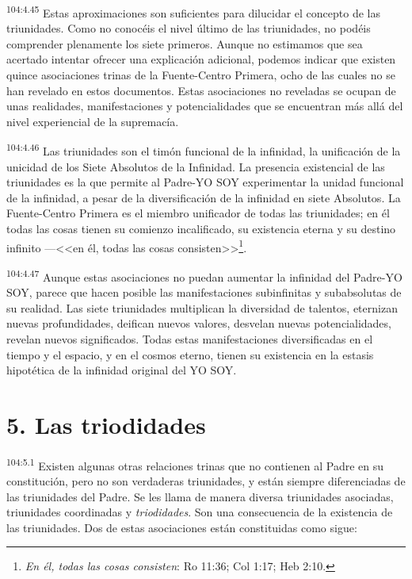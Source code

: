 \documentclass[twoside, 11pt]{book}
\begin{document}
\par
\textsuperscript{104:4.45} Estas aproximaciones son suficientes para dilucidar el concepto de las triunidades. Como no conocéis el nivel último de las triunidades, no podéis comprender plenamente los siete primeros. Aunque no estimamos que sea acertado intentar ofrecer una explicación adicional, podemos indicar que existen quince asociaciones trinas de la Fuente-Centro Primera, ocho de las cuales no se han revelado en estos documentos. Estas asociaciones no reveladas se ocupan de unas realidades, manifestaciones y potencialidades que se encuentran más allá del nivel experiencial de la supremacía.

\par
\textsuperscript{104:4.46} Las triunidades son el timón funcional de la infinidad, la unificación de la unicidad de los Siete Absolutos de la Infinidad. La presencia existencial de las triunidades es la que permite al Padre-YO SOY experimentar la unidad funcional de la infinidad, a pesar de la diversificación de la infinidad en siete Absolutos. La Fuente-Centro Primera es el miembro unificador de todas las triunidades; en él todas las cosas tienen su comienzo incalificado, su existencia eterna y su destino infinito ---<<en él, todas las cosas consisten>>\footnote{\textit{En él, todas las cosas consisten}: Ro 11:36; Col 1:17; Heb 2:10.}.

\par
\textsuperscript{104:4.47} Aunque estas asociaciones no puedan aumentar la infinidad del Padre-YO SOY, parece que hacen posible las manifestaciones subinfinitas y subabsolutas de su realidad. Las siete triunidades multiplican la diversidad de talentos, eternizan nuevas profundidades, deifican nuevos valores, desvelan nuevas potencialidades, revelan nuevos significados. Todas estas manifestaciones diversificadas en el tiempo y el espacio, y en el cosmos eterno, tienen su existencia en la estasis hipotética de la infinidad original del YO SOY.

\section*{5. Las triodidades}
\par
\textsuperscript{104:5.1} Existen algunas otras relaciones trinas que no contienen al Padre en su constitución, pero no son verdaderas triunidades, y están siempre diferenciadas de las triunidades del Padre. Se les llama de manera diversa triunidades asociadas, triunidades coordinadas y \textit{triodidades}. Son una consecuencia de la existencia de las triunidades. Dos de estas asociaciones están constituidas como sigue:
\end{document}
